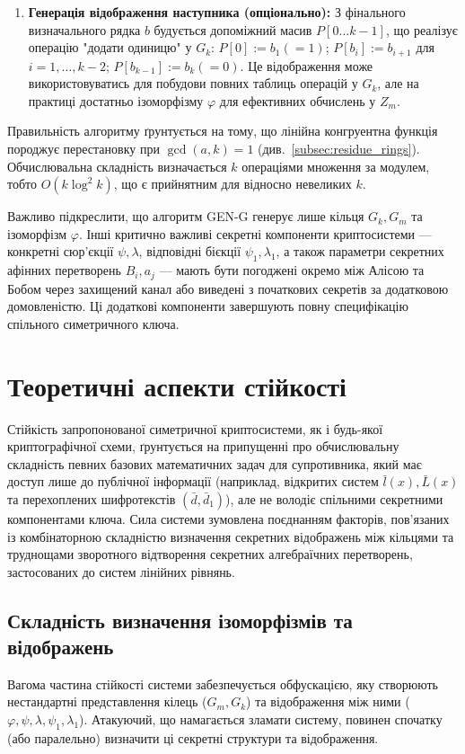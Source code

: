 \begin{itemize}
\begin{enumerate}
        \item \textbf{Генерація відображення наступника (опціонально):} З фінального визначального рядка $b$ будується допоміжний масив $P[0 \ldots k-1]$, що реалізує операцію "додати одиницю" у $G_k$: $P[0] := b_1 (=1)$; $P[b_i] := b_{i+1}$ для $i=1, \ldots, k-2$; $P[b_{k-1}] := b_k (=0)$. Це відображення може використовуватись для побудови повних таблиць операцій у $G_k$, але на практиці достатньо ізоморфізму $\varphi$ для ефективних обчислень у $Z_m$.
    \end{enumerate}
\end{itemize}
Правильність алгоритму ґрунтується на тому, що лінійна конгруентна функція породжує перестановку при $\gcd(a,k)=1$ (див.~\ref{subsec:residue_rings}).
Обчислювальна складність визначається $k$ операціями множення за модулем, тобто $O(k \log^2 k)$, що є прийнятним для відносно невеликих $k$.

Важливо підкреслити, що алгоритм GEN-G генерує лише кільця $G_k, G_m$ та ізоморфізм $\varphi$.
Інші критично важливі секретні компоненти криптосистеми — конкретні сюр'єкції $\psi, \lambda$, відповідні бієкції $\psi_1, \lambda_1$, а також параметри секретних афінних перетворень $B_i, a_j$ — мають бути погоджені окремо між Алісою та Бобом через захищений канал або виведені з початкових секретів за додатковою домовленістю.
Ці додаткові компоненти завершують повну специфікацію спільного симетричного ключа.


\section{Теоретичні аспекти стійкості}
\label{sec:theoretical_security}
Стійкість запропонованої симетричної криптосистеми, як і будь-якої криптографічної схеми, ґрунтується на припущенні про обчислювальну складність певних базових математичних задач для супротивника, який має доступ лише до публічної інформації (наприклад, відкритих систем $\bar{l}(x), \bar{L}(x)$ та перехоплених шифротекстів $(\bar{d}, \bar{d}_1)$), але не володіє спільними секретними компонентами ключа.
Сила системи зумовлена поєднанням факторів, пов'язаних із комбінаторною складністю визначення секретних відображень між кільцями та труднощами зворотного відтворення секретних алгебраїчних перетворень, застосованих до систем лінійних рівнянь.

\subsection{Складність визначення ізоморфізмів та відображень}
\label{subsec:hardness_mappings}
Вагома частина стійкості системи забезпечується обфускацією, яку створюють нестандартні представлення кілець ($G_m, G_k$) та відображення між ними ($\varphi, \psi, \lambda, \psi_1, \lambda_1$).
Атакуючий, що намагається зламати систему, повинен спочатку (або паралельно) визначити ці секретні структури та відображення.

